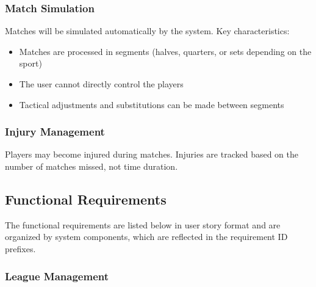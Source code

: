 \documentclass[12pt, a4paper]{article}
\begin{document}
\subsubsection*{Match Simulation}
Matches will be simulated automatically by the system.
Key characteristics:
\begin{itemize}
    \item Matches are processed in segments (halves, quarters, or sets depending on the sport)
    \item The user cannot directly control the players
    \item Tactical adjustments and substitutions can be made between segments
\end{itemize}

\subsubsection*{Injury Management}
Players may become injured during matches. Injuries are tracked based on the number of
matches missed, not time duration.

\subsection{Functional Requirements}

The functional requirements are listed below in user story format and are organized by system
components, which are reflected in the requirement ID prefixes.

\subsubsection*{League Management}
\end{document}

